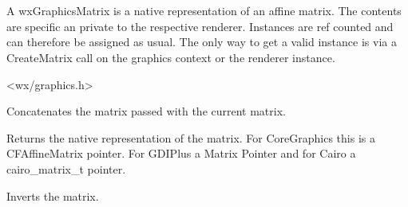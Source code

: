 
\section{}\label{wxgraphicsmatrix}

A wxGraphicsMatrix is a native representation of an affine matrix. The contents are specific an private to the respective renderer. Instances are ref counted and can therefore be assigned as usual. The only way to get a valid instance is via a CreateMatrix call on the graphics context or the renderer instance.




<wx/graphics.h>


\label{wxgraphicsmatrixconcat}


Concatenates the matrix passed with the current matrix.



\label{wxgraphicsmatrixgetnativematrix}


Returns the native representation of the matrix. For CoreGraphics this is a CFAffineMatrix pointer. For GDIPlus a Matrix Pointer and for Cairo a cairo\_matrix\_t pointer.

\label{wxgraphicsmatrixinvert}


Inverts the matrix.

\label{wxgraphicsmatrixisequal}

